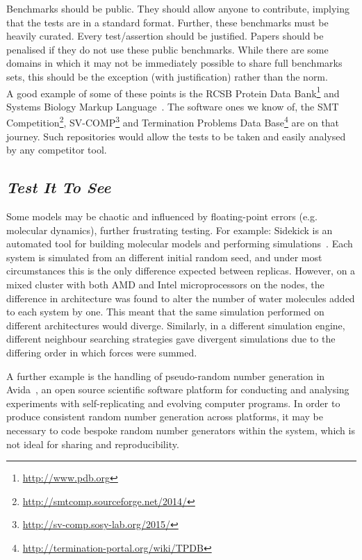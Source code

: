 \documentclass[a4paper,11pt]{article}
\begin{document}
 Benchmarks should
be public. They should allow anyone to contribute, implying that the
tests are in a standard format. Further, these benchmarks must be
heavily curated. Every test/assertion should be justified. Papers
should be penalised if they do not use these public benchmarks. While
there are some domains in which it may not be immediately possible to
share full benchmarks sets, this should be the exception (with
justification) rather than the norm.\\

A good example of some of these points is the RCSB Protein Data
Bank\footnote{\url{http://www.pdb.org}} and Systems Biology Markup
Language~\cite{Chaouiya2013}. The software ones we know of,
the SMT
Competition\footnote{\url{http://smtcomp.sourceforge.net/2014/}},
SV-COMP\footnote{\url{http://sv-comp.sosy-lab.org/2015/}} and
Termination Problems Data
Base\footnote{\url{http://termination-portal.org/wiki/TPDB}} are on
that journey. Such repositories would allow the tests to be taken and
easily analysed by any competitor tool.

\subsection{{\emph{Test It To See}}}

Some models may be chaotic and influenced by floating-point errors
(e.g. molecular dynamics), further frustrating testing. For example:
Sidekick is an automated tool for building molecular models and
performing simulations~\cite{Hall2014Sidekick}. Each system is
simulated from an different initial random seed, and under most
circumstances this is the only difference expected between
replicas. However, on a mixed cluster with both AMD and Intel
microprocessors on the nodes, the difference in architecture was found
to alter the number of water molecules added to each system by
one. This meant that the same simulation performed on different
architectures would diverge. Similarly, in a different simulation
engine, different neighbour searching strategies gave divergent
simulations due to the differing order in which forces were summed.

A further example is the handling of pseudo-random number generation in
Avida~\cite{ofria+wilke:2004}, an open source scientific software
platform for conducting and analysing experiments with
self-replicating and evolving computer programs. In order to produce
consistent random number generation across platforms, it may be
necessary to code bespoke random number generators within the system,
which is not ideal for sharing and reproducibility.\\
\end{document}
